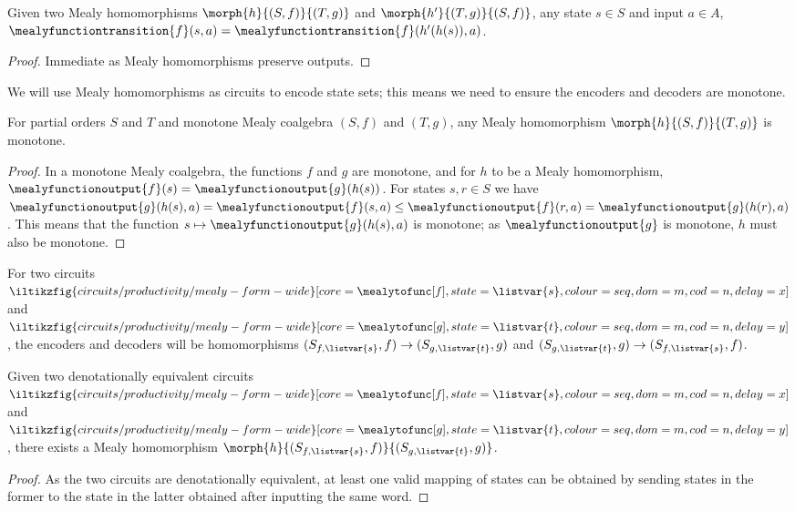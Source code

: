 \begin{lemma}
    Given two Mealy homomorphisms \(\morph{h}{(S,f)}{(T,g)}\) and
    \(\morph{h^\prime}{(T,g)}{(S,f)}\), any state \(s \in S\) and input
    \(a \in A\), \(
    \mealyfunctiontransition{f}(s, a)
    =
    \mealyfunctiontransition{f}(h^\prime(h(s)), a)
    \).
\end{lemma}
\begin{proof}
    Immediate as Mealy homomorphisms preserve outputs.
\end{proof}

We will use Mealy homomorphisms as circuits to encode state sets; this means we
need to ensure the encoders and decoders are monotone.

\begin{lemma}
    For partial orders \(S\) and \(T\) and monotone Mealy coalgebra
    \((S,f)\) and \((T,g)\), any Mealy homomorphism \(\morph{h}{(S,f)}{(T,g)}\)
    is monotone.
\end{lemma}
\begin{proof}
    In a monotone Mealy coalgebra, the functions \(f\) and \(g\) are monotone,
    and for \(h\) to be a Mealy homomorphism, \(
    \mealyfunctionoutput{f}(s)
    =
    \mealyfunctionoutput{g}(h(s))
    \).
    For states \(s,r \in S\) we have \(
    \mealyfunctionoutput{g}(h(s), a)
    =
    \mealyfunctionoutput{f}(s, a)
    \leq
    \mealyfunctionoutput{f}(r, a)
    =
    \mealyfunctionoutput{g}(h(r), a)
    \).
    This means that the function \(
    s \mapsto \mealyfunctionoutput{g}(h(s), a)
    \) is monotone; as \(\mealyfunctionoutput{g}\) is monotone, \(h\) must
    also be monotone.
\end{proof}

For two circuits \(
\iltikzfig{circuits/productivity/mealy-form-wide}[core=\mealytofunc[f],state=\listvar{s},colour=seq,dom=m,cod=n,delay=x]
\) and \(
\iltikzfig{circuits/productivity/mealy-form-wide}[core=\mealytofunc[g],state=\listvar{t},colour=seq,dom=m,cod=n,delay=y]
\), the encoders and decoders will be homomorphisms
\((S_{f,\listvar{s}},f) \to (S_{g,\listvar{t}},g)\)
and
\((S_{g,\listvar{t}},g) \to (S_{f,\listvar{s}},f)\).


\begin{proposition}
    Given two denotationally equivalent circuits \(
    \iltikzfig{circuits/productivity/mealy-form-wide}[core=\mealytofunc[f],state=\listvar{s},colour=seq,dom=m,cod=n,delay=x]
    \) and \(
    \iltikzfig{circuits/productivity/mealy-form-wide}[core=\mealytofunc[g],state=\listvar{t},colour=seq,dom=m,cod=n,delay=y]
    \), there exists a Mealy homomorphism \(
    \morph{h}{(S_{f,\listvar{s}},f)}{(S_{g,\listvar{t}},g)}
    \).
\end{proposition}
\begin{proof}
    As the two circuits are denotationally equivalent, at least one valid
    mapping of states can be obtained by sending states in the former to the
    state in the latter obtained after inputting the same word.
\end{proof}

